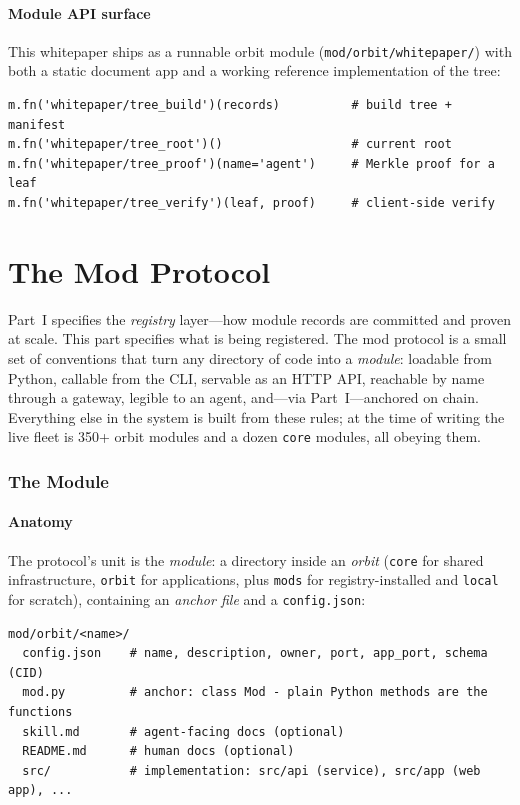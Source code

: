 \documentclass[11pt,a4paper]{article}
\begin{document}
\subsection{Module API surface}

This whitepaper ships as a runnable orbit module (\texttt{mod/orbit/whitepaper/}) with both a static document app and a working reference implementation of the tree:

\begin{lstlisting}[style=python]
m.fn('whitepaper/tree_build')(records)          # build tree + manifest
m.fn('whitepaper/tree_root')()                  # current root
m.fn('whitepaper/tree_proof')(name='agent')     # Merkle proof for a leaf
m.fn('whitepaper/tree_verify')(leaf, proof)     # client-side verify
\end{lstlisting}

\part{The Mod Protocol}

Part~I specifies the \emph{registry} layer---how module records are committed
and proven at scale. This part specifies what is being registered. The mod
protocol is a small set of conventions that turn any directory of code into a
\emph{module}: loadable from Python, callable from the CLI, servable as an HTTP
API, reachable by name through a gateway, legible to an agent, and---via
Part~I---anchored on chain. Everything else in the system is built from these
rules; at the time of writing the live fleet is 350+ orbit modules and a dozen
\texttt{core} modules, all obeying them.

\section{The Module}

\subsection{Anatomy}

The protocol's unit is the \emph{module}: a directory inside an \emph{orbit}
(\texttt{core} for shared infrastructure, \texttt{orbit} for applications,
plus \texttt{mods} for registry-installed and \texttt{local} for scratch),
containing an \emph{anchor file} and a \texttt{config.json}:

\begin{lstlisting}[style=python]
mod/orbit/<name>/
  config.json    # name, description, owner, port, app_port, schema (CID)
  mod.py         # anchor: class Mod - plain Python methods are the functions
  skill.md       # agent-facing docs (optional)
  README.md      # human docs (optional)
  src/           # implementation: src/api (service), src/app (web app), ...
\end{lstlisting}
\end{document}
